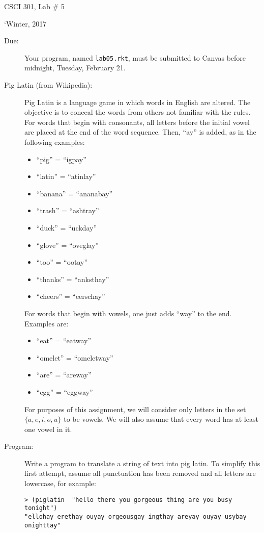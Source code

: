 \documentclass{article}
\begin{document}
\centerline{\Large CSCI 301, Lab \# 5}
\centerline{\large `Winter, 2017}


\begin{description}
\item[Due:] Your program, named {\tt lab05.rkt}, must be submitted to
  Canvas before midnight, Tuesday, February 21.

\item[Pig Latin (from Wikipedia):] Pig Latin is a language game in
  which words in English are altered. The objective is to conceal the
  words from others not familiar with the rules.  For words that begin
  with consonants, all letters before the initial vowel are
  placed at the end of the word sequence. Then, ``ay'' is added, as in
  the following examples:
\begin{itemize}
\item ``pig'' = ``igpay''
\item ``latin'' = ``atinlay''
\item ``banana'' = ``ananabay''
\item ``trash'' = ``ashtray''
\item ``duck'' = ``uckday''
\item ``glove'' = ``oveglay''
\item ``too'' = ``ootay''
\item ``thanks'' = ``anksthay''
\item ``cheers'' = ``eerschay''
\end{itemize}
For words that begin with vowels, one just adds ``way'' to the
end. Examples are: 
\begin{itemize}
\item   ``eat'' = ``eatway''
\item ``omelet'' = ``omeletway''
\item ``are'' = ``areway''
\item ``egg'' = ``eggway''
\end{itemize}
For purposes of this assignment, we will consider only letters in the
set $\{a,e,i,o,u\}$ to be vowels.  We will also assume that every word
has at least one vowel in it.

\item[Program:]\mbox{}

    Write a program to translate a string of text into
  pig latin.  To simplify this first attempt, assume all punctuation
  has been removed and all letters are lowercase, for example:
  \begin{verbatim}
> (piglatin  "hello there you gorgeous thing are you busy tonight")
"ellohay erethay ouyay orgeousgay ingthay areyay ouyay usybay onighttay"
\end{verbatim}


\end{description}
\end{document}

